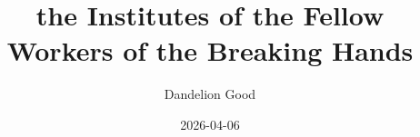 \newcommand{\historicaldeclaration}{%
    \begin{center}
        \begin{minipage}{\ifdefined\chapter 0.88\textwidth\else 0.75\textwidth\fi}
            \small
            \setlength{\parindent}{0pt}
            \setlength{\parskip}{0pt}
            \noindent
            \textbf{\large AS DECLARED} by unanimous consent of the \textit{Fellow Workers of the Breaking Hands}, in the 44th year of the cursed water frame.

            \comment{44YWF is 1813, third year of Luddite Rebellion}
            \par
        \end{minipage}
    \end{center}
    \vspace{2.5em} %
}




\usepackage[utf8]{inputenc}
\usepackage[english]{babel}
\usepackage[threshold=2,thresholdtype=lines]{csquotes}
%

\usepackage{fmtcount}

\newcommand{\comment}[1]{}

\newcommand{\edNote}[1]{
    \endnote
}



\pagestyle{fancy}
\fancyhf{}
\fancyfoot[C]{\thepage}

\renewcommand{\thesubsection}{\Roman{chapter}.\arabic{section}:\arabic{subsection}}



\author{Dandelion Good}
\title{the Institutes of the Fellow Workers of the Breaking Hands}
\date{2026-04-06}
